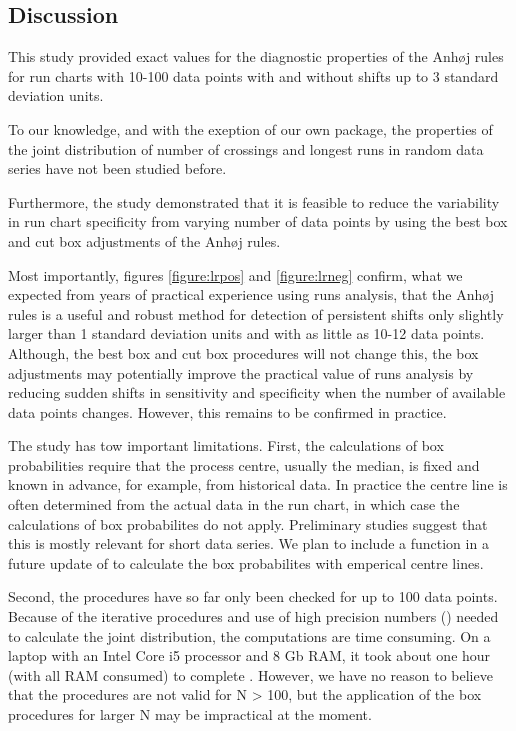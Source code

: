 \hypertarget{discussion}{%
\subsection{Discussion}\label{discussion}}

This study provided exact values for the diagnostic properties of the
Anhøj rules for run charts with 10-100 data points with and without
shifts up to 3 standard deviation units.

To our knowledge, and with the exeption of our own 
package, the properties of the joint distribution of number of crossings
and longest runs in random data series have not been studied before.

Furthermore, the study demonstrated that it is feasible to reduce the
variability in run chart specificity from varying number of data points
by using the best box and cut box adjustments of the Anhøj rules.

Most importantly, figures \ref{figure:lrpos} and \ref{figure:lrneg}
confirm, what we expected from years of practical experience using runs
analysis, that the Anhøj rules is a useful and robust method for
detection of persistent shifts only slightly larger than 1 standard
deviation units and with as little as 10-12 data points. Although, the
best box and cut box procedures will not change this, the box
adjustments may potentially improve the practical value of runs analysis
by reducing sudden shifts in sensitivity and specificity when the number
of available data points changes. However, this remains to be confirmed
in practice.

The study has tow important limitations. First, the calculations of box
probabilities require that the process centre, usually the median, is
fixed and known in advance, for example, from historical data. In
practice the centre line is often determined from the actual data in the
run chart, in which case the calculations of box probabilites do not
apply. Preliminary studies suggest that this is mostly relevant for
short data series. We plan to include a function in a future update of
 to calculate the box probabilites with emperical
centre lines.

Second, the procedures have so far only been checked for up to 100 data
points. Because of the iterative procedures and use of high precision
numbers () needed to calculate the joint distribution,
the computations are time consuming. On a laptop with an Intel Core i5
processor and 8 Gb RAM, it took about one hour (with all RAM consumed)
to complete . However, we have no reason to believe
that the procedures are not valid for N \textgreater{} 100, but the
application of the box procedures for larger N may be impractical at the
moment.


